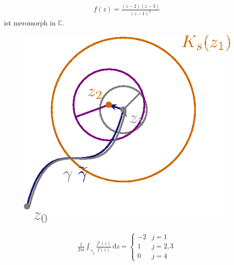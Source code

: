 \documentclass[a4paper,10pt]{scrbook}
\begin{document}
\begin{example}
  \begin{align*}
    f(z) = \frac{(z-2)(z-3)}{(z-1)^2}
  \end{align*}
  ist meromorph in $\mathbb C$.
  \begin{figure}[H]
    \centering
    \includegraphics[scale=0.2]{images/ana3-tmp-41}
    \vspace*{-3em}
  \end{figure}
  \begin{align*}
    \frac{1}{2\pi \mathrm{i}} \int_{\gamma_j} \frac{f'(z)}{f(z)} \, \mathrm dz
    =
    \begin{cases}
      -2 & j=1 \\
      1 & j=2,3 \\
      0 & j=4
    \end{cases}
  \end{align*}
\end{example}
\end{document}
